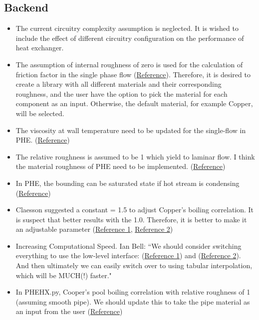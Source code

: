 \documentclass[]{article}
\begin{document}
\subsection{Backend}
\begin{itemize}
\item The current circuitry complexity assumption is neglected. It is wished to include the effect of different circuitry configuration on the performance of heat exchanger.
\item The assumption of internal roughness of zero is used for the calculation of friction factor in the single phase flow (\href{https://github.com/bo3mrh/ACHP-1/blob/master/ACHP/Correlations.py#L477}{Reference}). Therefore, it is desired to create a library with all different materials and their corresponding roughness, and the user have the option to pick the material for each component as an input. Otherwise, the default material, for example Copper, will be selected.
\item The viscosity at wall temperature need to be updated for the single-flow in PHE. (\href{https://github.com/OpenThermo/ACHP/blob/master/ACHP/Correlations.py#L570}{Reference})
\item The relative roughness is assumed to be 1 which yield to laminar flow. I think the material roughness of PHE need to be implemented. (\href{https://github.com/OpenThermo/ACHP/blob/master/ACHP/PHEHX.py#L494}{Reference})
\item In PHE, the bounding can be saturated state if hot stream is condensing (\href{https://github.com/OpenThermo/ACHP/blob/master/ACHP/PHEHX.py#L618}{Reference})
\item Claesson suggested a constant = 1.5 to adjust Copper's boiling correlation. It is suspect that better results with the 1.0. Therefore, it is better to make it an adjustable parameter (\href{https://github.com/OpenThermo/ACHP/blob/master/ACHP/PHEHX.py#L494}{Reference 1}, \href{https://github.com/OpenThermo/ACHP/blob/master/ACHP/Correlations.py#L623}{Reference 2})
\item Increasing Computational Speed. Ian Bell: ``We should consider switching everything to use the low-level interface: (\href{http://www.coolprop.org/dev/coolprop/wrappers/Python/index.html#example-code}{Reference 1}) and (\href{http://www.coolprop.org/dev/coolprop/LowLevelAPI.html}{Reference 2}). And then ultimately we can easily switch over to using tabular interpolation, which will be MUCH(!) faster."
\item In PHEHX.py, Cooper's pool boiling correlation with relative roughness of 1 (assuming smooth pipe). We should update this to take the pipe material as an input from the user (\href{https://github.com/OpenThermo/ACHP/blob/master/ACHP/PHEHX.py#L494}{Reference})

\end{itemize}
\end{document}
